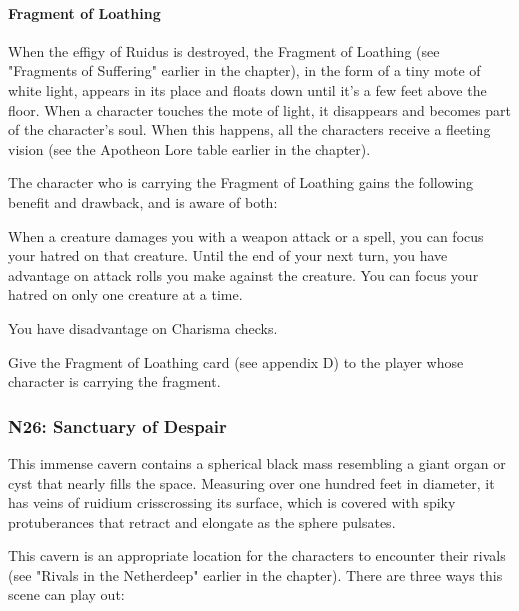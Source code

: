 \documentclass[10pt,a4paper,twoside,twocolumn,openany,nodeprecatedcode]{dndbook}
\begin{document}
\paragraph{Fragment of Loathing}
When the effigy of Ruidus is destroyed, the Fragment of Loathing (see "Fragments of Suffering" earlier in the chapter), in the form of a tiny mote of white light, appears in its place and floats down until it's a few feet above the floor. When a character touches the mote of light, it disappears and becomes part of the character's soul. When this happens, all the characters receive a fleeting vision (see the Apotheon Lore table earlier in the chapter).

The character who is carrying the Fragment of Loathing gains the following benefit and drawback, and is aware of both:

\begin{DndComment}{}

\begin{description}[nolistsep]
\item[Benefit.]
When a creature damages you with a weapon attack or a spell, you can focus your hatred on that creature. Until the end of your next turn, you have advantage on attack rolls you make against the creature. You can focus your hatred on only one creature at a time.
\item[Drawback.]
You have disadvantage on Charisma checks.
\end{description}

\end{DndComment}

Give the Fragment of Loathing card (see appendix D) to the player whose character is carrying the fragment.

\subsubsection{N26: Sanctuary of Despair}
\begin{DndReadAloud}{}
This immense cavern contains a spherical black mass resembling a giant organ or cyst that nearly fills the space. Measuring over one hundred feet in diameter, it has veins of ruidium crisscrossing its surface, which is covered with spiky protuberances that retract and elongate as the sphere pulsates.

\end{DndReadAloud}

This cavern is an appropriate location for the characters to encounter their rivals (see "Rivals in the Netherdeep" earlier in the chapter). There are three ways this scene can play out:
\end{document}
